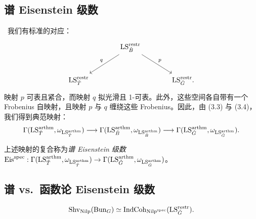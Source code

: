 \subsection{谱 Eisenstein 级数}

\ 我们有标准的对应：
\begin{equation*}
  \begin{tikzcd}[column sep=large, row sep=large]
    & \LS^{\restr}_{\bB} \arrow[dl, "q"'] \arrow[dr, "p"] & \\
    \LS^{\restr}_{\bT} & & \LS^{\restr}_{\bG}.
  \end{tikzcd}
\end{equation*}
映射 $p$ 可表且紧合，而映射 $q$ 拟光滑且 1-可表。此外，这些空间各自带有一个 Frobenius 自映射，且映射 $p$ 与 $q$ 缠绕这些 Frobenius。因此，由 (3.3) 与 (3.4)，我们得到典范映射：
\[
  \Gamma(\mathrm{LS}^{\mathrm{arthm}}_{\check{T}}, \omega_{\mathrm{LS}^{\mathrm{arthm}}_{\check{T}}}) \longrightarrow
  \Gamma(\mathrm{LS}^{\mathrm{arthm}}_{\check{B}}, \omega_{\mathrm{LS}^{\mathrm{arthm}}_{\check{B}}}) \longrightarrow
  \Gamma(\mathrm{LS}^{\mathrm{arthm}}_{\check{G}}, \omega_{\mathrm{LS}^{\mathrm{arthm}}_{\check{G}}}).
\]

\begin{defn}
上述映射的复合称为\emph{谱 Eisenstein 级数}
$\mathrm{Eis}^{\mathrm{spec}} : \Gamma(\mathrm{LS}^{\mathrm{arthm}}_{\check{T}}, \omega_{\mathrm{LS}^{\mathrm{arthm}}_{\check{T}}}) \to
\Gamma(\mathrm{LS}^{\mathrm{arthm}}_{\check{G}}, \omega_{\mathrm{LS}^{\mathrm{arthm}}_{\check{G}}})$。
\end{defn}

\subsection{谱 vs.\ 函数论 Eisenstein 级数}

\begin{equation}
  \mathrm{Shv}_{\mathrm{Nilp}}(\mathrm{Bun}_G) \simeq \mathrm{IndCoh}_{\mathrm{Nilp}^{\mathrm{spec}}}(\mathrm{LS}^{\mathrm{restr}}_{\check{G}}).
\end{equation}

